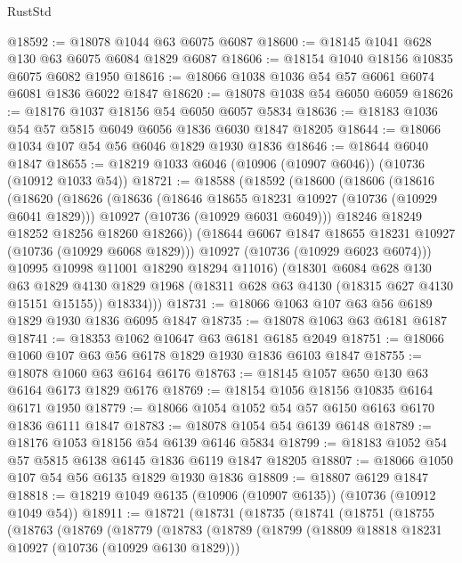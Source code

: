 \begin{lexlean}{RustStd}
\begin{coremodule}
@18592 := @18078 @1044 @63 @6075 @6087
@18600 := @18145 @1041 @628 @130 @63 @6075 @6084 @1829 @6087
@18606 := @18154 @1040 @18156 @10835 @6075 @6082 @1950
@18616 := @18066 @1038 @1036 @54 @57 @6061 @6074 @6081 @1836 @6022 @1847
@18620 := @18078 @1038 @54 @6050 @6059
@18626 := @18176 @1037 @18156 @54 @6050 @6057 @5834
@18636 := @18183 @1036 @54 @57 @5815 @6049 @6056 @1836 @6030 @1847 @18205
@18644 := @18066 @1034 @107 @54 @56 @6046 @1829 @1930 @1836
@18646 := @18644 @6040 @1847
@18655 := @18219 @1033 @6046 (@10906 (@10907 @6046)) (@10736 (@10912 @1033 @54))
@18721 := @18588
    (@18592
      (@18600
        (@18606
          (@18616
            (@18620
              (@18626
                (@18636
                  (@18646 @18655 @18231 @10927 (@10736 (@10929 @6041 @1829)))
                  @10927
                  (@10736 (@10929 @6031 @6049)))
                @18246
                @18249
                @18252
                @18256
                @18260
                @18266))
            (@18644 @6067 @1847 @18655 @18231 @10927 (@10736 (@10929 @6068 @1829)))
            @10927
            (@10736 (@10929 @6023 @6074)))
          @10995
          @10998
          @11001
          @18290
          @18294
          @11016)
        (@18301
          @6084
          @628
          @130
          @63
          @1829
          @4130
          @1829
          @1968
          (@18311 @628 @63 @4130 (@18315 @627 @4130 @15151 @15155))
          @18334)))
@18731 := @18066 @1063 @107 @63 @56 @6189 @1829 @1930 @1836 @6095 @1847
@18735 := @18078 @1063 @63 @6181 @6187
@18741 := @18353 @1062 @10647 @63 @6181 @6185 @2049
@18751 := @18066 @1060 @107 @63 @56 @6178 @1829 @1930 @1836 @6103 @1847
@18755 := @18078 @1060 @63 @6164 @6176
@18763 := @18145 @1057 @650 @130 @63 @6164 @6173 @1829 @6176
@18769 := @18154 @1056 @18156 @10835 @6164 @6171 @1950
@18779 := @18066 @1054 @1052 @54 @57 @6150 @6163 @6170 @1836 @6111 @1847
@18783 := @18078 @1054 @54 @6139 @6148
@18789 := @18176 @1053 @18156 @54 @6139 @6146 @5834
@18799 := @18183 @1052 @54 @57 @5815 @6138 @6145 @1836 @6119 @1847 @18205
@18807 := @18066 @1050 @107 @54 @56 @6135 @1829 @1930 @1836
@18809 := @18807 @6129 @1847
@18818 := @18219 @1049 @6135 (@10906 (@10907 @6135)) (@10736 (@10912 @1049 @54))
@18911 := @18721
    (@18731
      (@18735
        (@18741
          (@18751
            (@18755
              (@18763
                (@18769
                  (@18779
                    (@18783
                      (@18789
                        (@18799
                          (@18809 @18818 @18231 @10927 (@10736 (@10929 @6130 @1829)))

\end{coremodule}
\end{lexlean}
